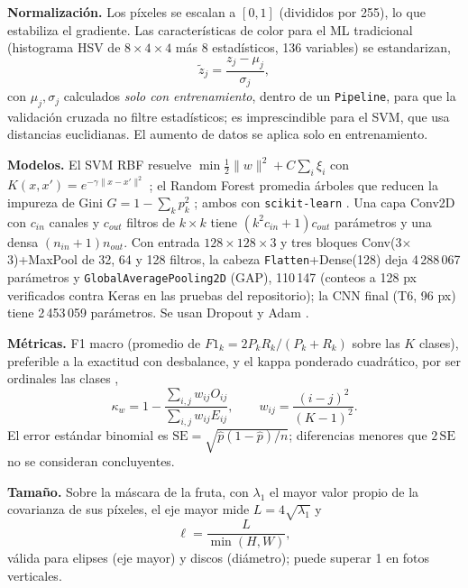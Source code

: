 \documentclass[conference]{IEEEtran}
\begin{document}
\textbf{Normalizaci\'on.} Los p\'ixeles se escalan a $[0,1]$ (divididos por 255), lo que estabiliza el gradiente. Las caracter\'isticas de color para el ML tradicional (histograma HSV de $8{\times}4{\times}4$ m\'as 8 estad\'isticos, 136 variables) se estandarizan,
\begin{equation}
\tilde z_j=\frac{z_j-\mu_j}{\sigma_j},
\end{equation}
con $\mu_j,\sigma_j$ calculados \emph{solo con entrenamiento}, dentro de un \texttt{Pipeline}, para que la validaci\'on cruzada no filtre estad\'isticos; es imprescindible para el SVM, que usa distancias euclidianas. El aumento de datos se aplica solo en entrenamiento.

\textbf{Modelos.} El SVM RBF resuelve $\min\tfrac12\lVert w\rVert^2+C\sum_i\xi_i$ con $K(x,x')=e^{-\gamma\lVert x-x'\rVert^2}$ \cite{cortes1995svm}; el Random Forest promedia \'arboles que reducen la impureza de Gini $G=1-\sum_k p_k^2$ \cite{breiman2001rf}; ambos con \texttt{scikit-learn} \cite{pedregosa2011sklearn}. Una capa Conv2D con $c_{in}$ canales y $c_{out}$ filtros de $k\times k$ tiene $(k^2c_{in}+1)c_{out}$ par\'ametros y una densa $(n_{in}+1)n_{out}$. Con entrada $128{\times}128{\times}3$ y tres bloques Conv(3$\times$3)+MaxPool de 32, 64 y 128 filtros, la cabeza \texttt{Flatten}+Dense(128) deja 4\,288\,067 par\'ametros y \texttt{GlobalAveragePooling2D} (GAP), 110\,147 (conteos a 128 px verificados contra Keras en las pruebas del repositorio); la CNN final (T6, 96 px) tiene 2\,453\,059 par\'ametros. Se usan Dropout \cite{srivastava2014dropout} y Adam \cite{kingma2014adam}.

\textbf{M\'etricas.} F1 macro (promedio de $F1_k=2P_kR_k/(P_k+R_k)$ sobre las $K$ clases), preferible a la exactitud con desbalance, y el kappa ponderado cuadr\'atico, por ser ordinales las clases \cite{cohen1960kappa,cohen1968weighted},
\begin{equation}
\kappa_w=1-\frac{\sum_{i,j}w_{ij}O_{ij}}{\sum_{i,j}w_{ij}E_{ij}},\qquad w_{ij}=\frac{(i-j)^2}{(K-1)^2}.
\end{equation}
El error est\'andar binomial es $\mathrm{SE}=\sqrt{\hat p(1-\hat p)/n}$; diferencias menores que $2\,\mathrm{SE}$ no se consideran concluyentes.

\textbf{Tama\~no.} Sobre la m\'ascara de la fruta, con $\lambda_1$ el mayor valor propio de la covarianza de sus p\'ixeles, el eje mayor mide $L=4\sqrt{\lambda_1}$ y
\begin{equation}
\ell=\frac{L}{\min(H,W)},\label{eq:ell}
\end{equation}
v\'alida para elipses (eje mayor) y discos (di\'ametro); puede superar 1 en fotos verticales.
\end{document}
